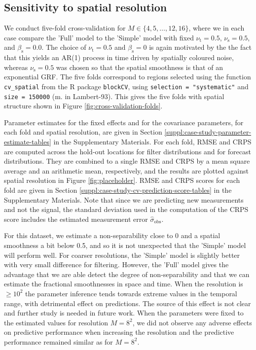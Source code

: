 \documentclass[12pt]{article} %
\begin{document}
\subsection{Sensitivity to spatial resolution}
\label{sec:sensitivity}
We conduct five-fold cross-validation for 
$M \in \{4, 5, \ldots, 12, 16\}$, where we in each case compare the 'Full' model to the 'Simple' model with fixed $\nu_\mathrm{t} = 0.5$, $\nu_\mathrm{s} = 0.5$, and $\beta_\mathrm{s} = 0.0$. The choice of $\nu_\mathrm{t}=0.5$ and $\beta_\mathrm{s}=0$ is again motivated by the the fact that this yields an AR(1) process in time driven by spatially coloured noise, whereas $\nu_\mathrm{s}=0.5$ was chosen so that the spatial smoothness is that of an exponential GRF. The five folds correspond to regions selected using the function \verb|cv_spatial| from the \textsf{R} package \texttt{blockCV}, using \verb|selection = "systematic"| and \verb|size = 150000| (m. in Lambert-93). This gives the five folds with spatial structure shown in Figure \ref{fig:cross-validation-folds}. 

Parameter estimates for the fixed effects and for the covariance parameters, for each fold and spatial resolution, are given in Section \ref{suppl:case-study-parameter-estimate-tables} in the Supplementary Materials. For each fold, RMSE and CRPS are computed across the hold-out locations for filter distributions and for forecast distributions. They are combined to a single RMSE and CRPS by a mean square average and an arithmetic mean, respectively, and the results are plotted against spatial resolution in Figure \ref{fig:placeholder}. RMSE and CRPS scores for each fold are given in Section \ref{suppl:case-study-cv-prediction-score-tables} in the Supplementary Materials. Note that since we are predicting new measurements and not the signal, the standard deviation used in the computation of the CRPS score includes the estimated measurement error $\hat{\sigma}_{\mathrm{obs}}$. 

For this dataset, we estimate a non-separability close to 0 and a spatial smoothness a bit below 0.5, and so it is not unexpected that the 'Simple' model will perform well. For coarser resolutions, the 'Simple' model is slightly better with very small difference for filtering. However, the 'Full' model gives the advantage that we are able detect the degree of non-separability and that we can estimate the fractional smoothnesses in space and time. When the resolution is $\geq10^2$ the parameter inference tends towards extreme values in the temporal range, with detrimental effect on predictions. The source of this effect is not clear and further study is needed in future work. When the parameters were fixed to the estimated values for resolution $M = 8^2$, we did not observe any adverse effects on predictive performance when increasing the resolution and the predictive performance remained similar as for $M = 8^2$.
\end{document}
